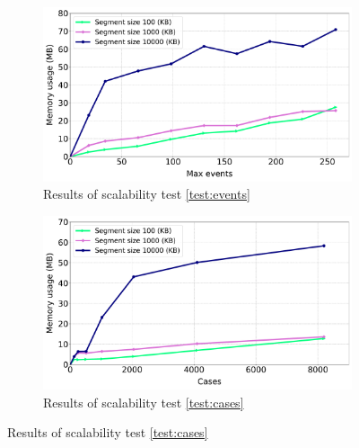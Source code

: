 \begin{figure}[t]
\begin{subfigure}{0.49\textwidth}   
  \centering
  \includegraphics[width=\textwidth]{content/figures/maxevents-2.pdf}
  \caption{Results of scalability test \ref{test:events}}
  \label{fig:event_results}
\end{subfigure}
\begin{subfigure}{0.49\textwidth}   
  \centering
  \includegraphics[width=\textwidth]{content/figures/numtraces-2.pdf}
  \caption{Results of scalability test \ref{test:cases}}
  \label{fig:cases_results}
\end{subfigure}


\end{figure}
